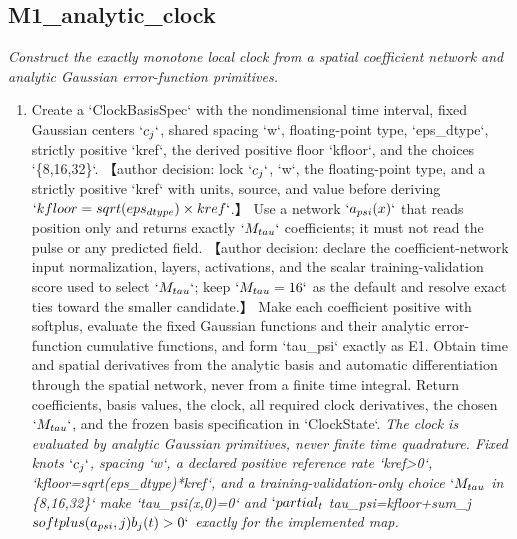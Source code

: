 \documentclass[10pt,a4paper]{article}
\begin{document}
\subsection*{M1\_analytic\_clock}
\emph{Construct the exactly monotone local clock from a spatial coefficient network and analytic Gaussian error-function primitives.}
\begin{enumerate}[leftmargin=*,start=2]
  \item Create a `ClockBasisSpec` with the nondimensional time interval, fixed Gaussian centers \(`c_{j}`\), shared spacing `w`, floating-point type, `eps\_dtype`, strictly positive `kref`, the derived positive floor `kfloor`, and the choices `\{8,16,32\}`. 【author decision: lock \(`c_{j}`\), `w`, the floating-point type, and a strictly positive `kref` with units, source, and value before deriving \(`kfloor=sqrt(eps_{dtype})\times kref`\).】 Use a network \(`a_{psi}(x)`\) that reads position only and returns exactly \(`M_{tau}`\) coefficients;\allowbreak{} it must not read the pulse or any predicted field. 【author decision: declare the coefficient-network input normalization, layers, activations, and the scalar training-validation score used to select \(`M_{tau}`\);\allowbreak{} keep \(`M_{tau}=16`\) as the default and resolve exact ties toward the smaller candidate.】 Make each coefficient positive with softplus, evaluate the fixed Gaussian functions and their analytic error-function cumulative functions, and form `tau\_psi` exactly as E1. Obtain time and spatial derivatives from the analytic basis and automatic differentiation through the spatial network, never from a finite time integral. Return coefficients, basis values, the clock, all required clock derivatives, the chosen \(`M_{tau}`\), and the frozen basis specification in `ClockState`.
\noindent\emph{The clock is evaluated by analytic Gaussian primitives, never finite time quadrature. Fixed knots \(`c_{j}`\), spacing `w`, a declared positive reference rate `kref>0`, `kfloor=sqrt(eps\_dtype)*kref`, and a training-validation-only choice \(`M_{tau}\) in \{8,16,32\}` make `tau\_psi(x,0)=0` and \(`partial_{t}\) tau\_psi=kfloor+sum\_j \(softplus(a_{psi},j)b_{j}(t)>0`\) exactly for the implemented map.}
\par{}

\end{enumerate}
\end{document}
